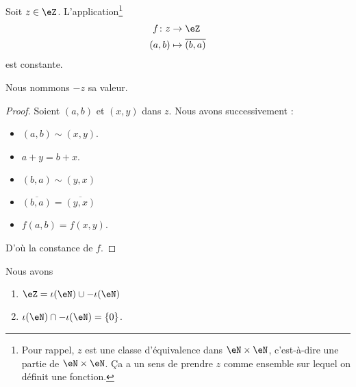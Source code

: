\begin{lemmaDef}
    Soit \( z\in \eZ\). L'application\footnote{Pour rappel, \( z\) est une classe d'équivalence dans \( \eN\times \eN\), c'est-à-dire une partie de \( \eN\times \eN\). Ça a un sens de prendre \( z\) comme ensemble sur lequel on définit une fonction.}
    \begin{equation}
        \begin{aligned}
            f\colon z&\to \eZ \\
            (a,b)&\mapsto \overline{ (b,a) } 
        \end{aligned}
    \end{equation}
    est constante.

    Nous nommons \( -z\) sa valeur.
\end{lemmaDef}

\begin{proof}
    Soient \( (a,b)\) et \( (x,y)\) dans \( z\). Nous avons successivement :
    \begin{itemize}
        \item 
    \( (a,b)\sim (x,y)\). 
\item
    \( a+y=b+x\).
\item 
    \( (b,a)\sim (y,x)\)
\item
    \( \overline{ (b,a) }=\overline{ (y,x) }\)
\item
    \( f(a,b)=f(x,y)\).
    \end{itemize}
    D'où la constance de \( f\).
\end{proof}

\begin{lemma}
    Nous avons
    \begin{enumerate}
        \item       \label{ITEMooSQFGooQPgIMu}
            \( \eZ=\iota(\eN)\cup -\iota(\eN)\)
        \item       \label{ITEMooHQUQooJeqULl}
            \( \iota(\eN)\cap -\iota(\eN)=\{ 0 \}\).
    \end{enumerate}
\end{lemma}

